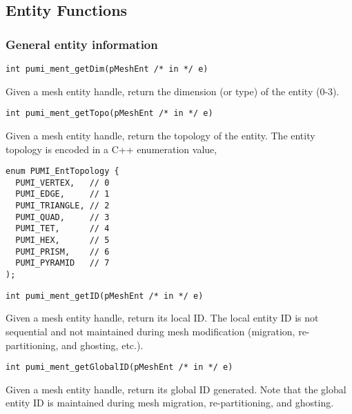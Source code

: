 \subsection{Entity Functions}

\subsubsection{General entity information}

\begin{verbatim}
int pumi_ment_getDim(pMeshEnt /* in */ e)
\end{verbatim}\vspace{-.5cm}\hspace{1cm}
        Given a mesh entity handle, return the dimension (or type) of the entity ($0$-$3$).

\begin{verbatim}
int pumi_ment_getTopo(pMeshEnt /* in */ e)
\end{verbatim}\vspace{-.5cm}\hspace{1cm}
        Given a mesh entity handle, return the topology of the entity. The entity topology is encoded in a C++ enumeration value,
\begin{verbatim}
enum PUMI_EntTopology {
  PUMI_VERTEX,   // 0
  PUMI_EDGE,     // 1
  PUMI_TRIANGLE, // 2
  PUMI_QUAD,     // 3
  PUMI_TET,      // 4
  PUMI_HEX,      // 5
  PUMI_PRISM,    // 6
  PUMI_PYRAMID   // 7
);
\end{verbatim}\vspace{-.5cm}\hspace{1cm}

\begin{verbatim}
int pumi_ment_getID(pMeshEnt /* in */ e)
\end{verbatim}\vspace{-.5cm}\hspace{1cm}
        Given a mesh entity handle, return its local ID. The local entity ID is not sequential and not maintained during mesh modification (migration, re-partitioning, and ghosting, etc.).

\begin{verbatim}
int pumi_ment_getGlobalID(pMeshEnt /* in */ e)
\end{verbatim}\vspace{-.5cm}\hspace{1cm}
        Given a mesh entity handle, return its global ID generated. Note that the global entity ID is maintained during mesh migration, re-partitioning, and ghosting.

